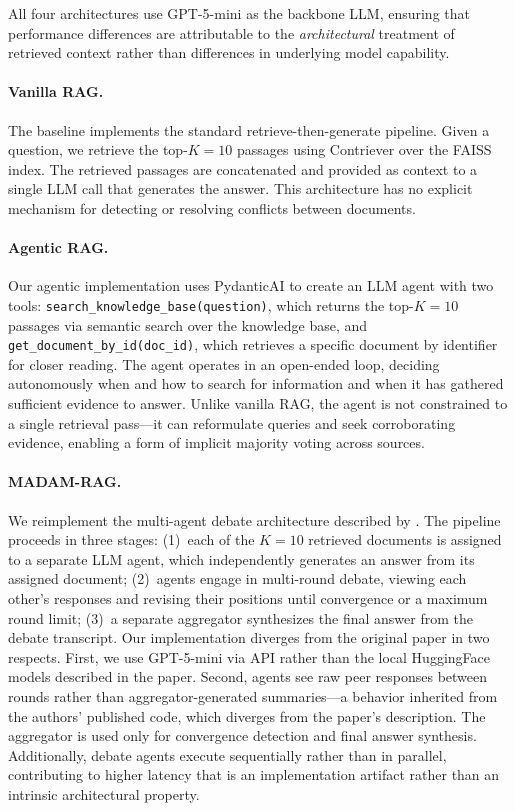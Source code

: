 \documentclass[11pt]{article}
\begin{document}
All four architectures use GPT-5-mini as the backbone LLM, ensuring that performance differences are attributable to the \emph{architectural} treatment of retrieved context rather than differences in underlying model capability.

\paragraph{Vanilla RAG.} The baseline implements the standard retrieve-then-generate pipeline. Given a question, we retrieve the top-$K{=}10$ passages using Contriever over the FAISS index. The retrieved passages are concatenated and provided as context to a single LLM call that generates the answer. This architecture has no explicit mechanism for detecting or resolving conflicts between documents.

\paragraph{Agentic RAG.} Our agentic implementation uses PydanticAI to create an LLM agent with two tools: \texttt{search\_knowledge\_base(question)}, which returns the top-$K{=}10$ passages via semantic search over the knowledge base, and \texttt{get\_document\_by\_id(doc\_id)}, which retrieves a specific document by identifier for closer reading. The agent operates in an open-ended loop, deciding autonomously when and how to search for information and when it has gathered sufficient evidence to answer. Unlike vanilla RAG, the agent is not constrained to a single retrieval pass---it can reformulate queries and seek corroborating evidence, enabling a form of implicit majority voting across sources.

\paragraph{MADAM-RAG.} We reimplement the multi-agent debate architecture described by \citet{wang2025madamrag}. The pipeline proceeds in three stages: (1)~each of the $K{=}10$ retrieved documents is assigned to a separate LLM agent, which independently generates an answer from its assigned document; (2)~agents engage in multi-round debate, viewing each other's responses and revising their positions until convergence or a maximum round limit; (3)~a separate aggregator synthesizes the final answer from the debate transcript. Our implementation diverges from the original paper in two respects. First, we use GPT-5-mini via API rather than the local HuggingFace models described in the paper. Second, agents see raw peer responses between rounds rather than aggregator-generated summaries---a behavior inherited from the authors' published code, which diverges from the paper's description. The aggregator is used only for convergence detection and final answer synthesis. Additionally, debate agents execute sequentially rather than in parallel, contributing to higher latency that is an implementation artifact rather than an intrinsic architectural property.
\end{document}
